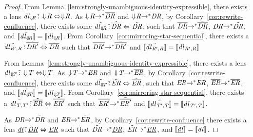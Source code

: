 \documentclass[numbers,10pt,preprint\ifanon ,nocopyrightspace\fi]{sigplanconf}
\begin{document}
\begin{proof}
  From Lemma~\ref{lem:strongly-unambiguous-identity-expressible}, there exists a
  lens $\mathit{dl}_{\Downarrow\mkern-4mu \mathit{R}} \,\tilde{:}\,
  \Downarrow\mkern-4mu \mathit{R} \Leftrightarrow \Downarrow\mkern-4mu \mathit{R}$.  As
  $\Downarrow\mkern-4mu \mathit{R} {\rightarrow}^* \overline{\mathit{DR}}$ and
  $\Downarrow\mkern-4mu \mathit{R} {\rightarrow}^* \mathit{DR}$, by
  Corollary~\ref{cor:rewrite-confluence}, there exists some
  $\tilde{\mathit{dl}_{\Downarrow\mkern-4mu \mathit{R}}} \,\tilde{:}\,
  \tilde{\overline{\mathit{DR}}} \Leftrightarrow \tilde{\mathit{DR}}$,
  such that
  $\overline{\mathit{DR}} {\rightarrow}^* \tilde{\overline{\mathit{DR}}}$,
  $\mathit{DR} {\rightarrow}^* \tilde{\mathit{DR}}$, and
  $[ \! [\tilde{\mathit{dl}_{\Downarrow\mkern-4mu \mathit{R}}}] \! ] =
  [ \! [\mathit{dl}_{\Downarrow\mkern-4mu \mathit{R}}] \! ]$.
  From Corollary~\ref{cor:mirroring-star-sequential}, there
  exists a $\tilde{\mathit{dl}_{\mathit{R}',\mathit{R}}} \,\tilde{:}\,
  \tilde{\overline{\mathit{DR}'}} \Leftrightarrow \tilde{\overline{\mathit{DR}}}$
  such that $\overline{\mathit{DR}'} {\rightarrow}^*
  \tilde{\overline{\mathit{DR}'}}$ and
  $[ \! [\tilde{\mathit{dl}_{\mathit{R}',\mathit{R}}}] \! ] =
  [ \! [\mathit{dl}_{\mathit{R}',\mathit{R}}] \! ]$

  From Lemma~\ref{lem:strongly-unambiguous-identity-expressible}, there exists a
  lens $\mathit{dl}_{\Downarrow\mkern-4mu \mathit{T}} \,\tilde{:}\,
  \Downarrow\mkern-4mu \mathit{T} \Leftrightarrow \Downarrow\mkern-4mu \mathit{T}$.  As
  $\Downarrow\mkern-4mu \mathit{T} {\rightarrow}^* \mathit{ER}$ and
  $\Downarrow\mkern-4mu \mathit{T} {\rightarrow}^* \overline{\mathit{ER}}$, by
  Corollary~\ref{cor:rewrite-confluence}, there exists some
  $\tilde{\mathit{dl}_{\Downarrow\mkern-4mu \mathit{T}}} \,\tilde{:}\,
  \tilde{\mathit{ER}} \Leftrightarrow \tilde{\overline{\mathit{ER}}}$,
  such that
  $\mathit{ER} {\rightarrow}^* \tilde{\mathit{ER}}$,
  $\overline{\mathit{ER}} {\rightarrow}^* \tilde{\overline{\mathit{ER}}}$, and
  $[ \! [\tilde{\mathit{dl}_{\Downarrow\mkern-4mu \mathit{T}}}] \! ] =
  [ \! [\mathit{dl}_{\Downarrow\mkern-4mu \mathit{T}}] \! ]$.
  From Corollary~\ref{cor:mirroring-star-sequential}, there
  exists a $\tilde{\mathit{dl}_{\mathit{T},\mathit{T}'}} \,\tilde{:}\,
  \tilde{\overline{\mathit{ER}}} \Leftrightarrow \tilde{\overline{\mathit{ER}'}}$
  such that $\overline{\mathit{ER}'} {\rightarrow}^*
  \tilde{\overline{\mathit{ER}'}}$ and
  $[ \! [\tilde{\mathit{dl}_{\mathit{T}',\mathit{T}}}] \! ] =
  [ \! [\mathit{dl}_{\mathit{T}',\mathit{T}}] \! ]$.

  As $\mathit{DR} {\rightarrow}^* \tilde{\mathit{DR}}$ and
  $\mathit{ER} {\rightarrow}^* \tilde{\mathit{ER}}$,
  by Corollary~\ref{cor:rewrite-confluence} there exists a lens
  $\underline{\mathit{dl}} \,\tilde{:}\, \underline{\mathit{DR}} \Leftrightarrow
  \underline{\mathit{ER}}$ such that
  $\tilde{\mathit{DR}} {\rightarrow}^* \underline{\mathit{DR}}$,
  $\tilde{\mathit{ER}} {\rightarrow}^* \underline{\mathit{ER}}$, and
  $[ \! [\underline{\mathit{dl}}] \! ] = [ \! [\mathit{dl}] \! ]$.
  

\end{proof}
\end{document}
